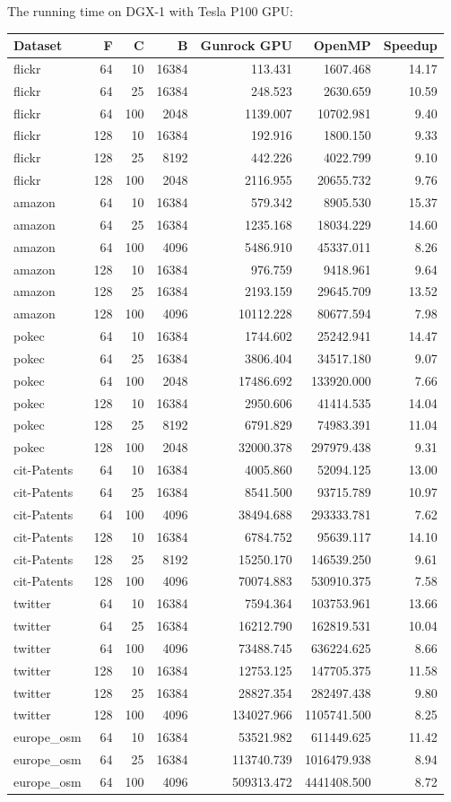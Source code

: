 \documentclass[10pt,oneside]{memoir}
\begin{document}
The running time on DGX-1 with Tesla P100 GPU:

\begin{longtable}[]{@{}lrrrrrr@{}}
\toprule
Dataset & F & C & B & Gunrock GPU & OpenMP & Speedup\tabularnewline
\midrule
\endhead
flickr & 64 & 10 & 16384 & 113.431 & 1607.468 & 14.17\tabularnewline
flickr & 64 & 25 & 16384 & 248.523 & 2630.659 & 10.59\tabularnewline
flickr & 64 & 100 & 2048 & 1139.007 & 10702.981 & 9.40\tabularnewline
flickr & 128 & 10 & 16384 & 192.916 & 1800.150 & 9.33\tabularnewline
flickr & 128 & 25 & 8192 & 442.226 & 4022.799 & 9.10\tabularnewline
flickr & 128 & 100 & 2048 & 2116.955 & 20655.732 & 9.76\tabularnewline
amazon & 64 & 10 & 16384 & 579.342 & 8905.530 & 15.37\tabularnewline
amazon & 64 & 25 & 16384 & 1235.168 & 18034.229 & 14.60\tabularnewline
amazon & 64 & 100 & 4096 & 5486.910 & 45337.011 & 8.26\tabularnewline
amazon & 128 & 10 & 16384 & 976.759 & 9418.961 & 9.64\tabularnewline
amazon & 128 & 25 & 16384 & 2193.159 & 29645.709 & 13.52\tabularnewline
amazon & 128 & 100 & 4096 & 10112.228 & 80677.594 & 7.98\tabularnewline
pokec & 64 & 10 & 16384 & 1744.602 & 25242.941 & 14.47\tabularnewline
pokec & 64 & 25 & 16384 & 3806.404 & 34517.180 & 9.07\tabularnewline
pokec & 64 & 100 & 2048 & 17486.692 & 133920.000 & 7.66\tabularnewline
pokec & 128 & 10 & 16384 & 2950.606 & 41414.535 & 14.04\tabularnewline
pokec & 128 & 25 & 8192 & 6791.829 & 74983.391 & 11.04\tabularnewline
pokec & 128 & 100 & 2048 & 32000.378 & 297979.438 & 9.31\tabularnewline
cit-Patents & 64 & 10 & 16384 & 4005.860 & 52094.125 &
13.00\tabularnewline
cit-Patents & 64 & 25 & 16384 & 8541.500 & 93715.789 &
10.97\tabularnewline
cit-Patents & 64 & 100 & 4096 & 38494.688 & 293333.781 &
7.62\tabularnewline
cit-Patents & 128 & 10 & 16384 & 6784.752 & 95639.117 &
14.10\tabularnewline
cit-Patents & 128 & 25 & 8192 & 15250.170 & 146539.250 &
9.61\tabularnewline
cit-Patents & 128 & 100 & 4096 & 70074.883 & 530910.375 &
7.58\tabularnewline
twitter & 64 & 10 & 16384 & 7594.364 & 103753.961 & 13.66\tabularnewline
twitter & 64 & 25 & 16384 & 16212.790 & 162819.531 &
10.04\tabularnewline
twitter & 64 & 100 & 4096 & 73488.745 & 636224.625 & 8.66\tabularnewline
twitter & 128 & 10 & 16384 & 12753.125 & 147705.375 &
11.58\tabularnewline
twitter & 128 & 25 & 16384 & 28827.354 & 282497.438 &
9.80\tabularnewline
twitter & 128 & 100 & 4096 & 134027.966 & 1105741.500 &
8.25\tabularnewline
europe\_osm & 64 & 10 & 16384 & 53521.982 & 611449.625 &
11.42\tabularnewline
europe\_osm & 64 & 25 & 16384 & 113740.739 & 1016479.938 &
8.94\tabularnewline
europe\_osm & 64 & 100 & 4096 & 509313.472 & 4441408.500 &
8.72\tabularnewline
\bottomrule
\end{longtable}
\end{document}
